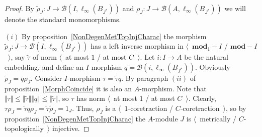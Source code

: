 \begin{proof} By $\widetilde{\rho}_J:J\to\mathcal{B}(I,\ell_\infty(B_{J^*}))$
and $\rho_J:J\to\mathcal{B}(A,\ell_\infty(B_{J^*}))$ we will denote the standard
monomorphisms.

$(i)$ By proposition~\ref{NonDegenMetTopInjCharac} the morphism
$\widetilde{\rho}_J: J\to\mathcal{B}(I,\ell_\infty(B_{J^*}))$ has a left inverse
morphism in $\langle$~$\mathbf{mod}_1-I$ / $\mathbf{mod}-I$~$\rangle$, say
$\widetilde{\tau}$ of norm $\langle$~at most $1$ / at most $C$~$\rangle$. Let
$i:I\to A$ be the natural embedding, and define an $I$-morphism
$q=\mathcal{B}(i,\ell_\infty(B_{J^*}))$. Obviously
$\widetilde{\rho}_J=q\rho_J$. Consider $I$-morphism $\tau =\widetilde{\tau} q$.
By paragraph $(ii)$ of proposition~\ref{MorphCoincide} it is also an
$A$-morphism. Note that 
$\Vert\tau \Vert
\leq\Vert\widetilde{\tau}\Vert\Vert q\Vert
\leq\Vert\widetilde{\tau}\Vert$, 
so $\tau$ has norm $\langle$~at most $1$ / at most $C$~$\rangle$. 
Clearly, 
$\tau \rho_J=\widetilde{\tau} q\rho_J=\widetilde{\tau}\widetilde{\rho}_J=1_J$. 
Thus, $\rho_J$ is a $\langle$~$1$-coretraction / $C$-coretraction~$\rangle$, 
so by proposition~\ref{NonDegenMetTopInjCharac} the $A$-module $J$ is
$\langle$~metrically / $C$-topologically~$\rangle$ injective.


\end{proof}
